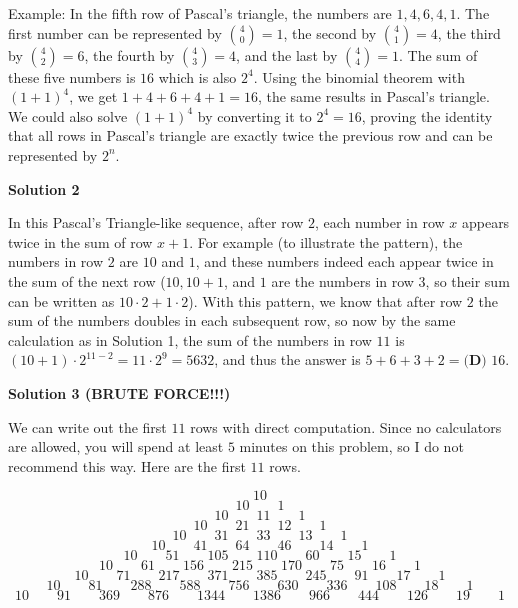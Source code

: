 \begin{enumerate}
 Example: In the fifth row of Pascal's triangle, the numbers are $1, 4, 6, 4, 1$. The first number can be represented by ${4 \choose 0} = 1$, the second by ${4 \choose 1} = 4$, the third by  ${4 \choose 2} = 6$, the fourth by  ${4 \choose 3} = 4$, and the last by  ${4 \choose 4} = 1$. The sum of these five numbers is $16$ which is also $2^{4}$. Using the binomial theorem with ${(1+1)}^4$, we get $1 + 4 + 6 + 4 + 1 = 16$, the same results in Pascal's triangle. We could also solve ${(1+1)}^4$ by converting it to $2^4 = 16$, proving the identity that all rows in Pascal's triangle are exactly twice the previous row and can be represented by $2^{n}$.

 



\textbf{Solution 2}

In this Pascal's Triangle-like sequence, after row $2$, each number in row $x$ appears twice in the sum of row $x+1$. For example (to illustrate the pattern), the numbers in row $2$ are $10$ and $1$, and these numbers indeed each appear twice in the sum of the next row ($10, 10+1$, and $1$ are the numbers in row $3$, so their sum can be written as $10 \cdot 2 + 1 \cdot 2$). With this pattern, we know that after row $2$ the sum of the numbers doubles in each subsequent row, so now by the same calculation as in Solution 1, the sum of the numbers in row $11$ is $(10+1) \cdot 2^{11-2} = 11 \cdot 2^9 = 5632$, and thus the answer is $5+6+3+2 = \boxed{\textbf{(D) }16}$.

 



\textbf{Solution 3 (BRUTE FORCE!!!)}

We can write out the first $11$ rows with direct computation. Since no calculators are allowed, you will spend at least $5$ minutes on this problem, so I do not recommend this way. Here are the first $11$ rows.

 

 \[10\]
 \[10\qquad 1\]
 \[10\qquad 11\qquad 1\]
 \[10\qquad 21\qquad 12\qquad 1\]
 \[10\qquad 31\qquad 33\qquad 13\qquad 1\]
 \[10\qquad 41\qquad 64\qquad 46\qquad 14\qquad 1\]
 \[10\qquad 51\qquad 105\qquad 110\qquad 60\qquad 15\qquad 1\]
 \[10\qquad 61\qquad 156\qquad 215\qquad 170\qquad 75\qquad 16\qquad 1\]
 \[10\qquad 71\qquad 217\qquad 371\qquad 385\qquad 245\qquad 91\qquad 17\qquad 1\]
 \[10\qquad 81\qquad 288\qquad 588\qquad 756\qquad 630\qquad 336\qquad 108\qquad 18\qquad 1\]
 \[10\qquad 91\qquad 369\qquad 876\qquad 1344\qquad 1386\qquad 966\qquad 444\qquad 126\qquad 19\qquad 1\]


\end{enumerate}
